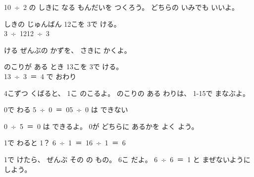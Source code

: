 \begin{jibun}
\mbox{10 ÷ 2} の しきに なる もんだいを つくろう。 どちらの いみでも いいよ。
\end{jibun}


\begin{tsumazuki}{しきの じゅんばん}\bkqmrag
12こを 3で ける。\\
\bkbatsu\enspace \mbox{3 ÷ 12}\hspace{3\zw}\bkmaru\enspace \mbox{12 ÷ 3}\par
{}ける ぜんぶの かずを、 さきに かくよ。
\end{tsumazuki}

\begin{tsumazuki}{のこりが ある とき}\bkqmrag
13こを 3で ける。\\
\bkbatsu\enspace \mbox{13 ÷ 3 ＝ 4} で おわり\par
4こずつ くばると、 1こ のこるよ。 のこりの ある わりは、 1-15で まなぶよ。
\end{tsumazuki}

\begin{tsumazuki}{0で わる}\bkqmrag
\bkbatsu\enspace \mbox{5 ÷ 0 ＝ 0}\hspace{3\zw}\bkmaru\enspace \mbox{5 ÷ 0} は できない\par
\mbox{0 ÷ 5 ＝ 0} は できるよ。 0が どちらに あるかを よく よう。
\end{tsumazuki}

\begin{tsumazuki}{1で わると 1？}\bkqmrag
\bkbatsu\enspace \mbox{6 ÷ 1 ＝ 1}\hspace{3\zw}\bkmaru\enspace \mbox{6 ÷ 1 ＝ 6}\par
1で けたら、 ぜんぶ その の もの。 6こ だよ。 \mbox{6 ÷ 6 ＝ 1} と まぜないように しよう。
\end{tsumazuki}

